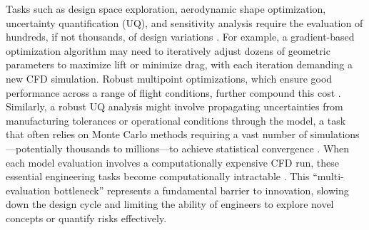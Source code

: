 \documentclass[dsc, EN]{ufabcFHZh}
\begin{document}
Tasks such as design space exploration, aerodynamic shape optimization, uncertainty quantification (UQ), and sensitivity analysis require the evaluation of hundreds, if not thousands, of design variations \citep{Yondo2018}. For example, a gradient-based optimization algorithm may need to iteratively adjust dozens of geometric parameters to maximize lift or minimize drag, with each iteration demanding a new CFD simulation. Robust multipoint optimizations, which ensure good performance across a range of flight conditions, further compound this cost \citep{Kenway2016}. Similarly, a robust UQ analysis might involve propagating uncertainties from manufacturing tolerances or operational conditions through the model, a task that often relies on Monte Carlo methods requiring a vast number of simulations---potentially thousands to millions---to achieve statistical convergence \citep{Smith2014}. When each model evaluation involves a computationally expensive CFD run, these essential engineering tasks become computationally intractable \citep{Slotnick2014}. This ``multi-evaluation bottleneck'' represents a fundamental barrier to innovation, slowing down the design cycle and limiting the ability of engineers to explore novel concepts or quantify risks effectively.
\end{document}
